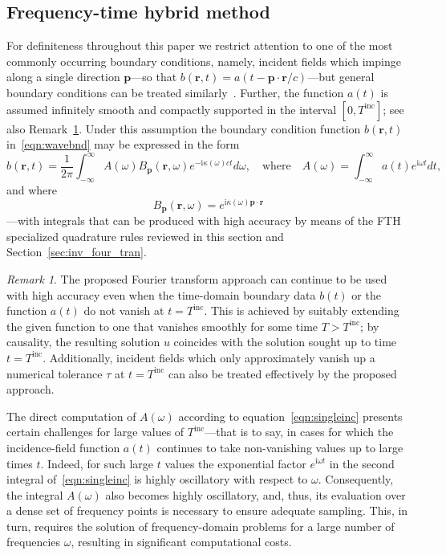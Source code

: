 \documentclass[11pt]{article}
\theoremstyle{plain}
\theoremstyle{remark}
\newtheorem{remark}{Remark}
\def \br{\mathbf{r}}
\def \bp{\mathbf{p}}
\begin{document}
\subsection{Frequency-time hybrid method}\label{sec:abl_rev}
For definiteness throughout this paper we restrict attention to one of the
most commonly occurring boundary conditions, namely, incident fields
which impinge along a single direction $\bp$---so that
$b(\br,t) = a(t - \bp \cdot \br /c)$---but general boundary conditions
can be treated similarly~\cite{ablII}.  Further, the function $a(t)$
is assumed infinitely smooth and compactly supported in the 
interval $[0,T^\mathrm{inc}]$; see also
Remark~\ref{rmk:incident}. Under this assumption the boundary
condition function $b(\br,t)$ in~\eqref{eqn:wavebnd} may be expressed
in the form
\begin{equation}\label{eqn:singleinc}
  b(\br,t) = \frac{1}{2\pi}\int_{-\infty}^\infty A(\omega)B_\bp(\br,\omega) e^{-\mathrm{i}\kappa(\omega)ct}d\omega, \quad \text{where} \quad A(\omega) = \int_{-\infty}^{\infty} a(t)e^{\mathrm{i}\omega t}dt,
\end{equation}
and where
\begin{equation}\label{eq:BP}
B_\bp(\br,\omega) = e^{\mathrm{i}\kappa(\omega) \bp \cdot \br}
\end{equation}
---with integrals that can be produced with high accuracy by means of
the FTH specialized quadrature rules reviewed in this section and
Section~\ref{sec:inv_four_tran}.

\begin{remark}\label{rmk:incident}
 The proposed Fourier transform approach can continue to be used
  with high accuracy even when the time-domain boundary data $b(t)$
  or the function $a(t)$ do not vanish at $t = T^\mathrm{inc}$. This
  is achieved by suitably extending the given function to one that
  vanishes smoothly for some time $T > T^\mathrm{inc}$; by causality,
  the resulting solution $u$ coincides with the solution sought up to
  time $t= T^\mathrm{inc}$. Additionally, incident fields which only approximately vanish up a numerical tolerance $\tau$ at $t = T^{\mathrm{inc}}$ can also be treated effectively by the proposed approach.
\end{remark}

The direct computation of $A(\omega)$ according to
equation~\eqref{eqn:singleinc} presents certain challenges for large
values of $T^\mathrm{inc}$---that is to say, in cases for which the
incidence-field function $a(t)$ continues to take non-vanishing values
up to large times $t$. Indeed, for such large $t$ values the
exponential factor $e^{\mathrm{i}\omega t}$ in the second integral
of~\eqref{eqn:singleinc} is highly oscillatory with respect to
$\omega$. Consequently, the integral $A(\omega)$ also becomes highly
oscillatory, and, thus, its evaluation over a dense set of frequency
points is necessary to ensure adequate sampling. This, in turn,
requires the solution of frequency-domain problems for a large number of
frequencies $\omega$, resulting in significant computational costs.
\end{document}
